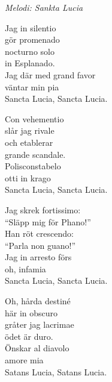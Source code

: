 {\footnotesize\textit{Melodi: Sankta Lucia}}\par
\vspace{10pt}
Jag in silentio\\
gör promenado\\
nocturno solo\\
in Esplanado.\\
Jag där med grand favor\\
väntar min pia\\
Sancta Lucia, Sancta Lucia.\par
\newpage
Con vehementio\\
slår jag rivale\\
och etablerar\\
grande scandale.\\
Polisconstabelo\\
otti in krago\\
Sancta Lucia, Sancta Lucia.\par
\vspace{10pt}
Jag skrek fortissimo:\\
``Släpp mig för Phano!''\\
Han röt crescendo:\\
``Parla non guano!''\\
Jag in arresto förs\\
oh, infamia\\
Sancta Lucia, Sancta Lucia.\par
\vspace{10pt}
Oh, hårda destiné\\
här in obscuro\\
gråter jag lacrimae\\
ödet är duro.\\
Önskar al diavolo\\
amore mia\\
Satans Lucia, Satans Lucia.
